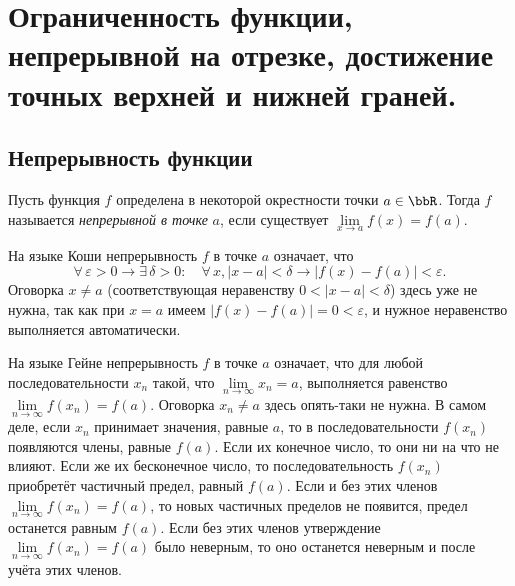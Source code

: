 \chapter{Ограниченность функции, непрерывной на отрезке, достижение точных верхней и нижней граней.}\label{chapter2}

\section{Непрерывность функции}


\begin{defn} \label{df3:4}
Пусть функция $f$ определена в некоторой окрестности точки $a \in \bbR$. Тогда $f$ называется \textit{непрерывной в точке} $a$, если существует $\lim\limits_{x \to a} f(x) = f(a)$.

На языке Коши непрерывность $f$ в точке $a$ означает, что
$$
\forall\, \varepsilon > 0 \to \exists\, \delta > 0 \colon \quad \forall\, x, |x - a| < \delta \to |f(x) - f(a)| < \varepsilon.
$$
Оговорка $x \ne a$ (соответствующая неравенству $0 < |x - a| < \delta$) здесь уже не нужна, так как при $x = a$ имеем $|f(x) - f(a)| = 0 < \varepsilon$, и нужное неравенство выполняется автоматически.

На языке Гейне непрерывность $f$ в точке $a$ означает, что для любой последовательности $x_n$ такой, что $\lim\limits_{n \to \infty} x_n = a$, выполняется равенство $\lim\limits_{n \to \infty} f(x_n) = f(a)$. Оговорка $x_n \ne a$ здесь опять-таки не нужна. В самом деле, если $x_n$ принимает значения, равные $a$, то в последовательности $f(x_n)$ появляются члены, равные $f(a)$. Если их конечное число, то они ни на что не влияют. Если же их бесконечное число, то последовательность $f(x_n)$ приобретёт частичный предел, равный $f(a)$. Если и без этих членов $\lim\limits_{n \to \infty} f(x_n) = f(a)$, то новых частичных пределов не появится, предел останется равным $f(a)$. Если без этих членов утверждение $\lim\limits_{n \to \infty} f(x_n) = f(a)$ было неверным, то оно останется неверным и после учёта этих членов.
\end{defn}


